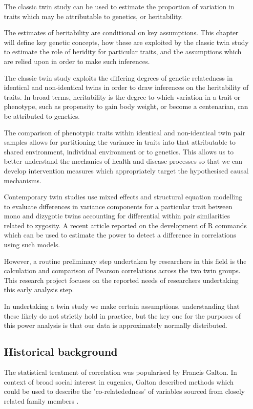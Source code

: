 The classic twin study can be used to estimate the proportion of variation in traits which may be attributable to genetics, or heritability.  

The estimates of heritability are conditional on key assumptions.  This chapter will define key genetic concepts, how these are exploited by the classic twin study to estimate the role of heridity for particular traits, and the assumptions which are relied upon in order to make such inferences.

The classic twin study exploits the differing degrees of genetic relatedness in identical and non-identical twins in order to draw inferences on the heritability of traits.  In broad terms, heritability is the degree to which variation in a trait or phenotype, such as propensity to gain body weight, or become a centenarian, can be attributed to genetics.

The comparison of phenotypic traits within identical and non-identical twin pair samples allows for partitioning the variance in traits into that attributable to  shared environment, individual environment or to genetics.  This allows us to better understand the mechanics of health and disease processes so that we can develop intervention measures which appropriately target the hypothesised causal mechanisms.

Contemporary twin studies use mixed effects and structural equation modelling to evaluate differences in variance components for a particular trait between mono and dizygotic twins accounting for differential within pair similarities related to zygosity.  A recent article reported on the development of R commands which can be used to estimate the power to detect a difference in correlations using such models.  

However, a routine preliminary step undertaken by researchers in this field is the calculation and comparison of Pearson correlations across the two twin groups.  This research project focuses on the reported needs of researchers undertaking this early analysis step.

In undertaking a twin study we make certain assumptions, understanding that these likely do not strictly hold in practice, but the key one for the purposes of this power analysis is that our data is approximately normally distributed.

\subsection{Historical background}
The statistical treatment of correlation was popularised by Francis Galton.  In context of broad social interest in eugenics, Galton described methods which could be used to describe the 'co-relatededness' of variables sourced from closely related family members \cite{Galton1888,Galton1890}.  

